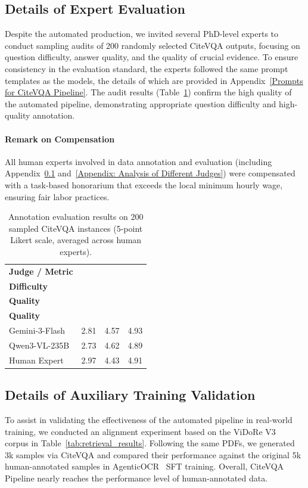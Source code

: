 \documentclass[]{opendatalab}
\begin{document}
{{{\subsection{Details of Expert Evaluation}
\label{Appendix: Details of Expert Evaluation}
Despite the automated production, we invited several PhD-level experts to conduct sampling audits of 200 randomly selected CiteVQA outputs, focusing on question difficulty, answer quality, and the quality of crucial evidence. To ensure consistency in the evaluation standard, the experts followed the same prompt templates as the models, the details of which are provided in Appendix~\ref{Prompts for CiteVQA Pipeline}. The audit results (Table~\ref{tab:Expert Evaluation}) confirm the high quality of the automated pipeline, demonstrating appropriate question difficulty and high-quality annotation.

\paragraph{Remark on Compensation} All human experts involved in data annotation and evaluation (including Appendix~\ref{Appendix: Details of Expert Evaluation} and~\ref{Appendix: Analysis of Different Judges}) were compensated with a task-based honorarium that exceeds the local minimum hourly wage, ensuring fair labor practices.

\begin{table}[htbp]
 \centering
 \footnotesize
 \caption{Annotation evaluation results on 200 sampled CiteVQA instances (5-point Likert scale, averaged across human experts).}
 \label{tab:Expert Evaluation}
 \begin{tabular}{lccc}
 \toprule
 \textbf{Judge / Metric} &
 \makecell{\textbf{Question}\\ \textbf{Difficulty}} &
 \makecell{\textbf{Answer}\\ \textbf{Quality}} &
 \makecell{\textbf{Evidence}\\ \textbf{Quality}} \\
 \midrule
 Gemini-3-Flash & 2.81 & 4.57 & 4.93 \\
 Qwen3-VL-235B & 2.73 & 4.62 & 4.89 \\
 Human Expert & 2.97 & 4.43 & 4.91 \\
 \bottomrule
 \end{tabular}
\end{table}

\subsection{Details of Auxiliary Training Validation}
\label{Appendix: Auxiliary Training Validation}
To assist in validating the effectiveness of the automated pipeline in real-world training, we conducted an alignment experiment based on the ViDoRe V3~\citep{loison2026vidore} corpus in Table~\ref{tab:retrieval_results}. Following the same PDFs, we generated 3k samples via CiteVQA and compared their performance against the original 5k human-annotated samples in AgenticOCR~\citep{wang2026agenticocr} SFT training. Overall, CiteVQA Pipeline nearly reaches the performance level of human-annotated data.

}}}
\end{document}
